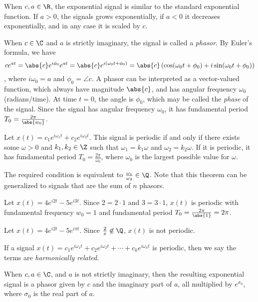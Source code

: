 \documentclass[12pt]{article}
\begin{document}
When $c, a \in \R$, the exponential signal is similar to the standard exponential function. If $a > 0$, the signals grows exponentially, if $a < 0$ it decreases exponentially, and in any case it is scaled by $c$.

When $c \in \C$ and $a$ is strictly imaginary, the signal is called a \emph{phasor}. By Euler's formula, we have \[ce^{at} = \abs{c}e^{i\phi_0}e^{at} = \abs{c}e^{i(\omega_0t + \phi_0)} = \abs{c}\left(\cos(\omega_0t + \phi_0) + i\sin(\omega_0t + \phi_0)\right)\], where $i\omega_0 = a$ and $\phi_0 = \angle c$. A phasor can be interpreted as a vector-valued function, which always have magnitude $\abs{c}$, and has angular frequency $\omega_0$ (radians/time). At time $t = 0$, the angle is $\phi_0$, which may be called the \emph{phase} of the signal. Since the signal has angular frequency $\omega_0$, it has fundamental period $T_0 = \frac{2\pi}{\abs{w_0}}$.

\begin{thm}
    Let $x(t) = c_1e^{i\omega_1t} + c_2e^{i\omega_2t}$. This signal is periodic if and only if there exists some $\omega > 0$ and $k_1, k_2 \in \Z$ such that $\omega_1 = k_1\omega$ and $\omega_2 = k_2\omega$. If it is periodic, it has fundamental period $T_0 = \frac{2\pi}{\omega_0}$, where $\omega_0$ is the largest possible value for $\omega$.
\end{thm}

\begin{rmk}
    The required condition is equivalent to $\frac{\omega_1}{\omega_2} \in \Q$. Note that this theorem can be generalized to signals that are the sum of $n$ phasors.
\end{rmk}

\begin{exmp}
    Let $x(t) = 4e^{i2t} - 5e^{i3t}$. Since $2 = 2\cdot 1$ and $3 = 3 \cdot 1$, $x(t)$ is periodic with fundamental frequency $w_0 = 1$ and fundamental period $T_0 = \frac{2\pi}{\abs{1}} = 2\pi$.
\end{exmp}

\begin{exmp}
    Let $x(t) = 4e^{i2t} - 5e^{i\pi t}$. Since $\frac{2}{\pi} \not\in \Q$, $x(t)$ is not periodic.
\end{exmp}

\begin{defn}
    If a signal $x(t) = c_1e^{i\omega_1t} + c_2e^{i\omega_2t} + \cdots + c_ke^{i\omega_kt}$ is periodic, then we say the terms are \emph{harmonically related}.
\end{defn}

When $c, a \in \C$, and $a$ is not strictly imaginary, then the resulting exponential signal is a phasor given by $c$ and the imaginary part of $a$, all multiplied by $e^{\sigma_0}$, where $\sigma_0$ is the real part of $a$.
\end{document}
